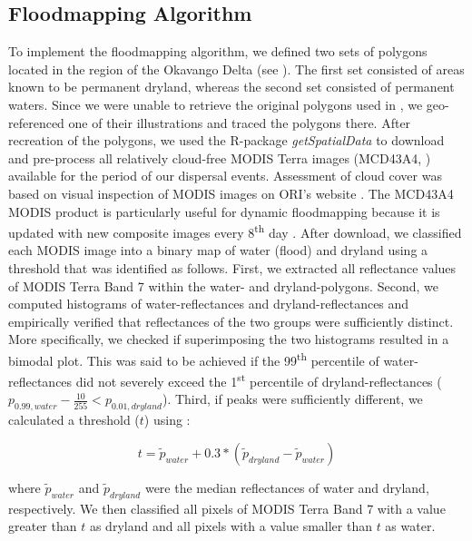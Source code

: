 \documentclass[abstract=on,10pt,a4paper,bibliography=totocnumbered]{scrartcl}
\begin{document}
\newpage
\subsection{Floodmapping Algorithm}
\label{Appendix:FloodmappingAlgorithm}
To implement the floodmapping algorithm, we defined two sets of polygons located
in the region of the Okavango Delta (see ). The first set
consisted of areas known to be permanent dryland, whereas the second set
consisted of permanent waters. Since we were unable to retrieve the original
polygons used in \cite{Wolski.2017}, we geo-referenced one of their
illustrations and traced the polygons there. After recreation of the polygons,
we used the R-package \textit{getSpatialData} \citep{Schwalb.2018} to download
and pre-process all relatively cloud-free MODIS Terra images (MCD43A4,
\citealp{Schaaf.2015}) available for the period of our dispersal events.
Assessment of cloud cover was based on visual inspection of MODIS images on
ORI's website \citep{ORI.2019}. The MCD43A4 MODIS product is particularly useful
for dynamic floodmapping because it is updated with new composite images every
8\textsuperscript{th} day \citep{Wolski.2017}. After download, we classified
each MODIS image into a binary map of water (flood) and dryland using a
threshold that was identified as follows. First, we extracted all reflectance
values of MODIS Terra Band 7 within the water- and dryland-polygons. Second, we
computed histograms of water-reflectances and dryland-reflectances and
empirically verified that reflectances of the two groups were sufficiently
distinct. More specifically, we checked if superimposing the two histograms
resulted in a bimodal plot. This was said to be achieved if the
99\textsuperscript{th} percentile of water-reflectances did not severely exceed
the 1\textsuperscript{st} percentile of dryland-reflectances (\(p_{0.99, water}
- \frac{10}{255} < p_{0.01, dryland}\)). Third, if peaks were sufficiently
different, we calculated a threshold (\(t\)) using :

\begin{equation}
\label{EQ1}
t = \widetilde{p}_{water} + 0.3 * (\widetilde{p}_{dryland} -
\widetilde{p}_{water})
\end{equation}

\noindent where \(\widetilde{p}_{water}\) and \(\widetilde{p}_{dryland}\) were
the median reflectances of water and dryland, respectively. We then classified
all pixels of MODIS Terra Band 7 with a value greater than \(t\) as dryland and
all pixels with a value smaller than \(t\) as water.
\end{document}
